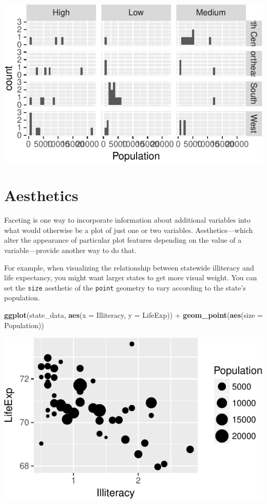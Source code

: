 \documentclass[12pt,oneside,openany]{book}
\newenvironment{Shaded}{\begin{snugshade}}{\end{snugshade}}
\newcommand{\KeywordTok}[1]{\textcolor[rgb]{0.13,0.29,0.53}{\textbf{{#1}}}}
\newcommand{\DataTypeTok}[1]{\textcolor[rgb]{0.13,0.29,0.53}{{#1}}}
\newcommand{\StringTok}[1]{\textcolor[rgb]{0.31,0.60,0.02}{{#1}}}
\newcommand{\NormalTok}[1]{{#1}}
\begin{document}
\includegraphics{pdaps_files/figure-latex/facet-grid-1.pdf}

\section{Aesthetics}\label{aesthetics}

Faceting is one way to incorporate information about additional
variables into what would otherwise be a plot of just one or two
variables. Aesthetics---which alter the appearance of particular plot
features depending on the value of a variable---provide another way to
do that.

For example, when visualizing the relationship between statewide
illiteracy and life expectancy, you might want larger states to get more
visual weight. You can set the \texttt{size} aesthetic of the
\texttt{point} geometry to vary according to the state's population.

\begin{Shaded}
\begin{Highlighting}[]
\KeywordTok{ggplot}\NormalTok{(state_data, }\KeywordTok{aes}\NormalTok{(}\DataTypeTok{x =} \NormalTok{Illiteracy, }\DataTypeTok{y =} \NormalTok{LifeExp)) +}
\StringTok{  }\KeywordTok{geom_point}\NormalTok{(}\KeywordTok{aes}\NormalTok{(}\DataTypeTok{size =} \NormalTok{Population))}
\end{Highlighting}
\end{Shaded}

\includegraphics{pdaps_files/figure-latex/aes-size-1.pdf}
\end{document}
